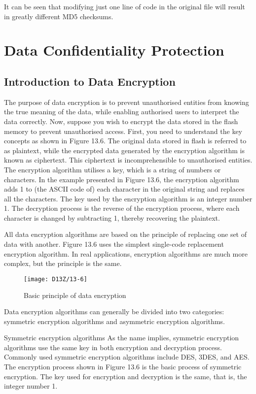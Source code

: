 \documentclass[a4paper,12pt]{book}
\begin{document}
It can be seen that modifying just one line of code in the original file will result in greatly different MD5 checksums.

\section{Data Confidentiality Protection}
\subsection{Introduction to Data Encryption}
The purpose of data encryption is to prevent unauthorised entities from knowing the true meaning of the data, while enabling authorised users to interpret the data correctly. Now, suppose you wish to encrypt the data stored in the flash memory to prevent unauthorised access. First, you need to understand the key concepts as shown in Figure 13.6. The original data stored in flash is referred to as plaintext, while the encrypted data generated by the encryption algorithm is known as ciphertext. This ciphertext is incomprehensible to unauthorised entities. The encryption algorithm utilises a key, which is a string of numbers or characters. In the example presented in Figure 13.6, the encryption algorithm adds 1 to (the ASCII code of) each character in the original string and replaces all the characters. The key used by the encryption algorithm is an integer number 1. The decryption process is the reverse of the encryption process, where each character is changed by subtracting 1, thereby recovering the plaintext.

All data encryption algorithms are based on the principle of replacing one set of data with another. Figure 13.6 uses the simplest single-code replacement encryption algorithm. In real applications, encryption algorithms are much more complex, but the principle is the same.

\begin{figure}[!h]
    \centering
    \texttt{[image: D13Z/13-6]}
    \caption{Basic principle of data encryption}
\end{figure}

Data encryption algorithms can generally be divided into two categories: symmetric encryption algorithms and asymmetric encryption algorithms.

\begin{term}{Symmetric encryption algorithms}
    As the name implies, symmetric encryption algorithms use the same key in both encryption and decryption process. Commonly used symmetric encryption algorithms include DES, 3DES, and AES. The encryption process shown in Figure 13.6 is the basic process of symmetric encryption. The key used for encryption and decryption is the same, that is, the integer number 1.
\end{term}
\end{document}
